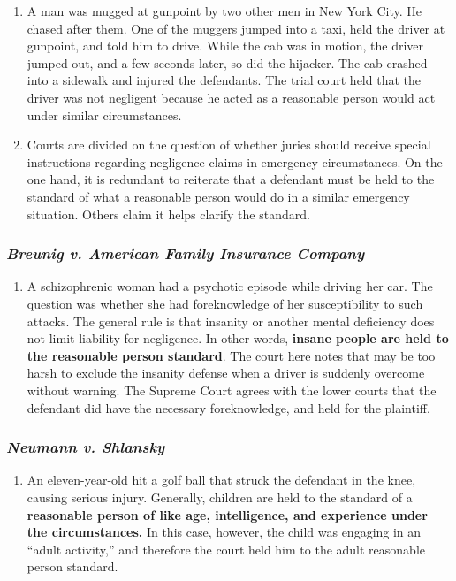 \begin{enumerate}
    \item A man was mugged at gunpoint by two other men in New York City. He chased after them. One of the muggers jumped into a taxi, held the driver at gunpoint, and told him to drive. While the cab was in motion, the driver jumped out, and a few seconds later, so did the hijacker. The cab crashed into a sidewalk and injured the defendants. The trial court held that the driver was not negligent because he acted as a reasonable person would act under similar circumstances.
    \item Courts are divided on the question of whether juries should receive special instructions regarding negligence claims in emergency circumstances. On the one hand, it is redundant to reiterate that a defendant must be held to the standard of what a reasonable person would do in a similar emergency situation. Others claim it helps clarify the standard.
\end{enumerate}

\subsubsection{\emph{Breunig v. American Family Insurance Company}}

\begin{enumerate}
    \item A schizophrenic woman had a psychotic episode while driving her car. The question was whether she had foreknowledge of her susceptibility to such attacks. The general rule is that insanity or another mental deficiency does not limit liability for negligence. In other words, \textbf{insane people are held to the reasonable person standard}. The court here notes that may be too harsh to exclude the insanity defense when a driver is suddenly overcome without warning. The Supreme Court agrees with the lower courts that the defendant did have the necessary foreknowledge, and held for the plaintiff. 
\end{enumerate}

\subsubsection{\emph{Neumann v. Shlansky}}

\begin{enumerate}
    \item An eleven-year-old hit a golf ball that struck the defendant in the knee, causing serious injury. Generally, children are held to the standard of a \textbf{reasonable person of like age, intelligence, and experience under the circumstances.} In this case, however, the child was engaging in an ``adult activity,'' and therefore the court held him to the adult reasonable person standard.
\end{enumerate}

